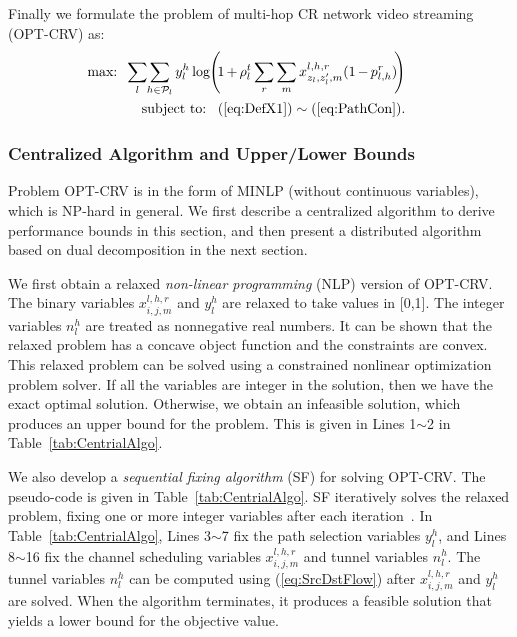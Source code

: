 \documentclass[12pt,onecolumn,draftclsnofoot]{IEEEtran} %
\begin{document}
Finally we formulate the problem of multi-hop CR network video streaming (OPT-CRV) as:
\begin{eqnarray}
	&& \hspace{-0.4in} \mbox{max:} \;\; \sum_l \hspace{-0.03in} \sum_{h \in \mathcal{P}_l}y_l^h \log \hspace{-0.03in} \left( \hspace{-0.03in} 1 \hspace{-0.01in} + \hspace{-0.01in} \rho_l^t \sum_r \sum_m x_{z_l,z'_l,m}^{l,h,r} (1 \hspace{-0.01in} - \hspace{-0.01in} p_{l,h}^r) \hspace{-0.03in} \right) \label{eq:PriProb} \\
	&& \hspace{-0.4in} \mbox{subject to:} \;\;\; (\ref{eq:DefX1}) \sim (\ref{eq:PathCon}).  \nonumber
\end{eqnarray}


\subsubsection{Centralized Algorithm and Upper/Lower Bounds}

Problem OPT-CRV is in the form of MINLP (without continuous variables), which is NP-hard in general.  We first describe a centralized algorithm to derive performance bounds in this section, and then present a distributed algorithm based on dual decomposition in the next section.  

We first obtain a relaxed {\em non-linear programming} (NLP) version of OPT-CRV.  The binary variables $x_{i,j,m}^{l,h,r}$ and $y_l^h$ are relaxed to take values in [0,1].  The integer variables $n_l^h$ are treated as nonnegative real numbers.  It can be shown that the relaxed problem has a concave object function and the constraints are convex.  This relaxed problem can be solved using a constrained nonlinear optimization problem solver.  If all the variables are integer in the solution, then we have the exact optimal solution.  Otherwise, we obtain an infeasible solution, which produces an upper bound for the problem. This is given in Lines 1$\sim$2 in Table~\ref{tab:CentrialAlgo}. 

We also develop a {\em sequential fixing algorithm} (SF) for solving OPT-CRV.  The pseudo-code is given in Table~\ref{tab:CentrialAlgo}.  SF iteratively solves the relaxed problem, fixing one or more integer variables after each iteration~\cite{Hou08}.  In Table~\ref{tab:CentrialAlgo}, Lines 3$\sim$7 fix the path selection variables $y_l^h$, and Lines 8$\sim$16 fix the channel scheduling variables $x_{i,j,m}^{l,h,r}$ and tunnel variables $n_l^h$.  The tunnel variables $n_l^h$ can be computed using (\ref{eq:SrcDstFlow}) after $x_{i,j,m}^{l,h,r}$ and $y_l^h$ are solved.  When the algorithm terminates, it produces a feasible solution that yields a lower bound for the objective value. 
\end{document}

